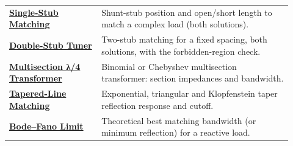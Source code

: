 \begin{longtable}{>{\raggedright\arraybackslash}p{0.30\linewidth}>{\raggedright\arraybackslash}p{0.62\linewidth}}
\href{https://rftoolbox.ca/SingleStubMatch.html}{\textbf{Single-Stub Matching}} & Shunt-stub position and open/short length to match a complex load (both solutions). \\
\href{https://rftoolbox.ca/DoubleStubTuner.html}{\textbf{Double-Stub Tuner}} & Two-stub matching for a fixed spacing, both solutions, with the forbidden-region check. \\
\href{https://rftoolbox.ca/MultisectionTransformer.html}{\textbf{Multisection λ/4 Transformer}} & Binomial or Chebyshev multisection transformer: section impedances and bandwidth. \\
\href{https://rftoolbox.ca/KlopfensteinTaper.html}{\textbf{Tapered-Line Matching}} & Exponential, triangular and Klopfenstein taper reflection response and cutoff. \\
\href{https://rftoolbox.ca/BodeFano.html}{\textbf{Bode–Fano Limit}} & Theoretical best matching bandwidth (or minimum reflection) for a reactive load. \\
\hline
\end{longtable}

